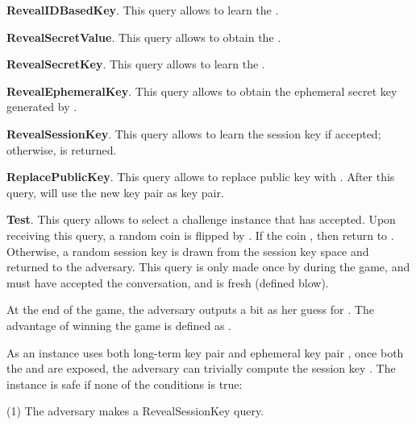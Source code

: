 \documentclass[final,1p,times,twocolumn]{elsarticle}
\begin{document}
\vspace{0.2cm}

{\bf RevealIDBasedKey}. This query allows  to learn the .

\vspace{0.2cm}

{\bf RevealSecretValue}. This query allows  to obtain the .

\vspace{0.2cm}

{\bf RevealSecretKey}. This query allows  to learn the .

\vspace{0.2cm}

{\bf RevealEphemeralKey}. This query allows  to obtain the ephemeral secret key generated by .

\vspace{0.2cm}

{\bf RevealSessionKey}. This query allows  to learn the session key  if  accepted; otherwise,  is returned.

\vspace{0.2cm}

{\bf ReplacePublicKey}. This query allows  to replace  public key with . After this query,  will use the new key pair as   key pair.

\vspace{0.2cm}

{\bf Test}. This query allows  to select a challenge instance  that has accepted. Upon receiving this query, a random coin  is flipped by . If the coin , then  return  to . Otherwise, a random session key is drawn from the session key space and returned to the adversary. This query is only made once by  during the game, and  must have accepted the conversation, and is fresh (defined blow).

\vspace{0.2cm}

At the end of the game, the adversary  outputs a bit  as her guess for . The advantage of  winning the game is defined as .

As an instance  uses both  long-term key pair  and ephemeral key pair , once both the  and  are exposed, the adversary can trivially compute the session key . The instance  is safe if none of the conditions is true:

\vspace{0.1cm}

(1) The adversary makes a RevealSessionKey query.

\vspace{0.1cm}
\end{document}
